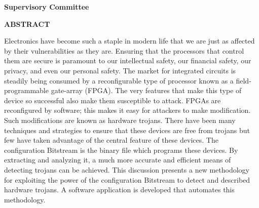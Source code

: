 \newpage
{}

\noindent \textbf{Supervisory Committee}
\tpbreak
\panel

\begin{center}
\textbf{ABSTRACT}
\end{center}

Electronics have become such a staple in modern life that we are just as affected by their vulnerabilities as they are.
Ensuring that the processors that control them are secure is paramount to our intellectual safety, our financial safety, our privacy, and even our personal safety.
The market for integrated circuits is steadily being consumed by a reconfigurable type of processor known as a field-programmable gate-array (FPGA).
The very features that make this type of device so successful also make them susceptible to attack.
FPGAs are reconfigured by software; this makes it easy for attackers to make modification.
Such modifications are known as hardware trojans.
There have been many techniques and strategies to ensure that these devices are free from trojans but few have taken advantage of the central feature of these devices.
The configuration Bitstream is the binary file which programs these devices.
By extracting and analyzing it, a much more accurate and efficient means of detecting trojans can be achieved.
This discussion presents a new methodology for exploiting the power of the configuration Bitstream to detect and described hardware trojans.
A software application is developed that automates this methodology.
